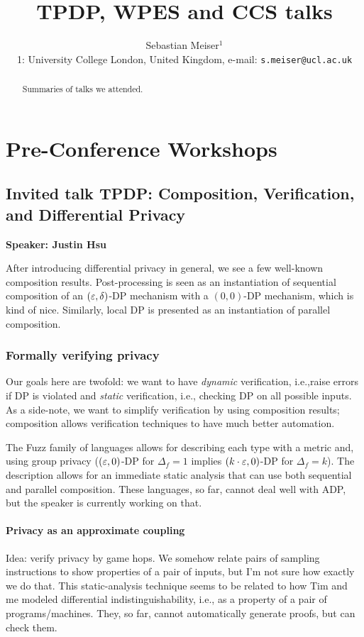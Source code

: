 \documentclass{article}
\title{TPDP, WPES and CCS talks}
\author{Sebastian Meiser$^1$
\\%
 1: University College London, United Kingdom, e-mail: \texttt{s.meiser@ucl.ac.uk}\\%
}
\begin{document}
\maketitle

\begin{abstract}
Summaries of talks we attended.
\end{abstract}

\tableofcontents
\clearpage

\section{Pre-Conference Workshops}

\subsection{Invited talk TPDP: Composition, Verification, and Differential Privacy}
\noindent\textbf{Speaker: Justin Hsu}

After introducing differential privacy in general, we see a few well-known composition results.
Post-processing is seen as an instantiation of sequential composition of an $(\varepsilon,\delta)$-DP mechanism with a $(0,0)$-DP mechanism, which is kind of nice. Similarly, local DP is presented as an instantiation of parallel composition.

\subsubsection{Formally verifying privacy}
Our goals here are twofold: we want to have \emph{dynamic} verification, i.e.,raise errors if DP is violated and \emph{static} verification, i.e., checking DP on all possible inputs.
As a side-note, we want to simplify verification by using composition results; composition allows verification techniques to have much better automation.


The Fuzz family of languages allows for describing each type with a metric and, using group privacy ($(\varepsilon,0)$-DP for $\Delta_f = 1$ implies $(k\cdot \varepsilon,0)$-DP for $\Delta_f = k$). The description allows for an immediate static analysis that can use both sequential and parallel composition. These languages, so far, cannot deal well with ADP, but the speaker is currently working on that.

\paragraph{Privacy as an approximate coupling}
Idea: verify privacy by game hops. We somehow relate pairs of sampling instructions to show properties of a pair of inputs, but I'm not sure how exactly we do that. This static-analysis technique seems to be related to how Tim and me modeled differential indistinguishability, i.e., as a property of a pair of programs/machines. They, so far, cannot automatically generate proofs, but can check them.
\end{document}

